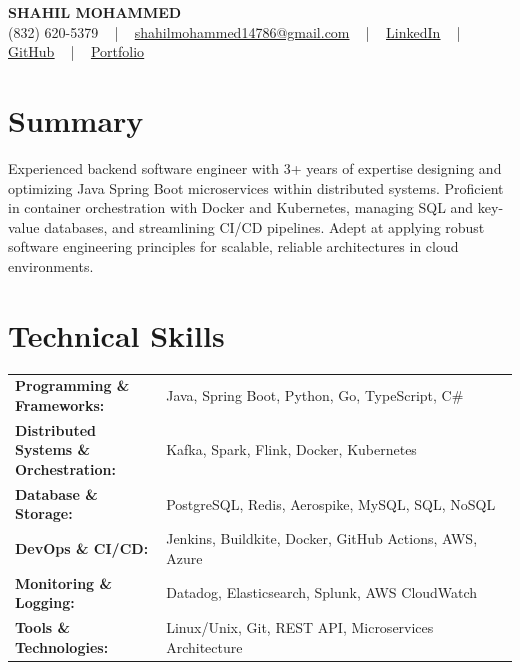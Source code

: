 \documentclass[letterpaper,11pt]{article}
\begin{document}
\begin{center}
    {\fontsize{14pt}{12pt}\selectfont \textbf{\MakeUppercase{Shahil Mohammed}}}\\ \vspace{2pt}
    \fontsize{10pt}{12pt}\selectfont (832) 620-5379 ~ | ~ \href{mailto:shahilmohammed14786@gmail.com}{shahilmohammed14786@gmail.com} ~ | ~  
    \href{https://www.linkedin.com/in/shahil-mohammed-9652931a1/}{\color{blue}\underline{LinkedIn}}  ~ | ~ 
    \href{https://github.com/freakbeast14}{\color{blue}\underline{GitHub}} ~ | ~ 
    \href{https://shahil-mohammed.netlify.app/}{\color{blue}\underline{Portfolio}}
    \vspace{-8pt}
\end{center}

\section{Summary}
\fontsize{9pt}{10pt}\selectfont
Experienced backend software engineer with 3+ years of expertise designing and optimizing Java Spring Boot microservices within distributed systems. Proficient in container orchestration with Docker and Kubernetes, managing SQL and key-value databases, and streamlining CI/CD pipelines. Adept at applying robust software engineering principles for scalable, reliable architectures in cloud environments.

 \vspace{-5pt}
 
\section{Technical Skills}
        \vspace{-14pt}
        \begin{table}[h]
            \fontsize{9pt}{10pt}\selectfont
            \begin{tabular}{p{0.3\linewidth} p{0.7\linewidth}}
                \textbf{Programming \& Frameworks:} & Java, Spring Boot, Python, Go, TypeScript, C\# \\
                \textbf{Distributed Systems \& Orchestration:} & Kafka, Spark, Flink, Docker, Kubernetes \\
                \textbf{Database \& Storage:} & PostgreSQL, Redis, Aerospike, MySQL, SQL, NoSQL \\
                \textbf{DevOps \& CI/CD:} & Jenkins, Buildkite, Docker, GitHub Actions, AWS, Azure \\
                \textbf{Monitoring \& Logging:} & Datadog, Elasticsearch, Splunk, AWS CloudWatch \\
                \textbf{Tools \& Technologies:} & Linux/Unix, Git, REST API, Microservices Architecture \\
            \end{tabular}
        \end{table}
 \vspace{-15pt}
 
\end{document}
